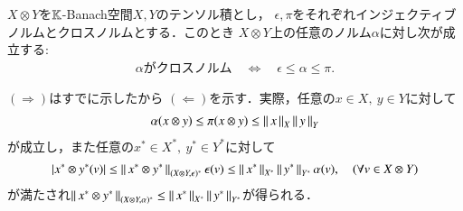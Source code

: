 	\begin{screen}
		\begin{thm}
			$X \otimes Y$を$\mathbb{K}$-Banach空間$X,Y$のテンソル積とし，
			$\epsilon, \pi$をそれぞれインジェクティブノルムとクロスノルムとする．このとき
			$X \otimes Y$上の任意のノルム$\alpha$に対し次が成立する:
			\begin{align}
				\mbox{$\alpha$がクロスノルム}
				\quad \Leftrightarrow \quad 
				\epsilon \leq \alpha \leq \pi.
			\end{align}
		\end{thm}
	\end{screen}
	
	\begin{prf}
		$(\Rightarrow)$はすでに示したから
		$(\Leftarrow)$を示す．実際，任意の$x \in X,\ y \in Y$に対して
		\begin{align}
			\alpha(x \otimes y) \leq \pi(x \otimes y) \leq \left\|\, x\, \right\|_{X} \left\|\, y\, \right\|_{Y}
		\end{align}
		が成立し，また任意の$x^* \in X^*,\ y^* \in Y^*$に対して
		\begin{align}
			\left| x^* \otimes y^*(v) \right|
			\leq \left\|\, x^* \otimes y^*\, \right\|_{(X \otimes Y, \epsilon)^*} \epsilon(v)
			\leq \left\|\, x^*\, \right\|_{X^*} \left\|\, y^*\, \right\|_{Y^*} \alpha(v),
			\quad (\forall v \in X \otimes Y)
		\end{align}
		が満たされ$\left\|\, x^* \otimes y^*\, \right\|_{(X \otimes Y, \alpha)^*} 
		\leq \left\|\, x^*\, \right\|_{X^*} \left\|\, y^*\, \right\|_{Y^*}$が得られる．
		\QED
	\end{prf}